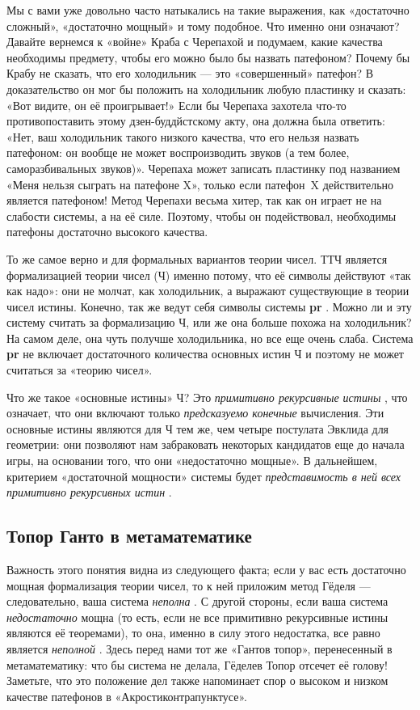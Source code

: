 \documentclass[../main.tex]{subfiles}
\begin{document}
Мы с вами уже довольно часто натыкались на такие выражения, как «достаточно сложный», «достаточно мощный» и тому подобное. Что именно они означают? Давайте вернемся к «войне» Краба с Черепахой и подумаем, какие качества необходимы предмету, чтобы его можно было бы назвать патефоном? Почему бы Крабу не сказать, что его холодильник --- это «совершенный» патефон? В доказательство он мог бы положить на холодильник любую пластинку и сказать: «Вот видите, он её проигрывает!» Если бы Черепаха захотела что-то противопоставить этому дзен-буддйстскому акту, она должна была ответить: «Нет, ваш холодильник такого низкого качества, что его нельзя назвать патефоном: он вообще не может воспроизводить звуков (а тем более, саморазбивальных звуков)». Черепаха может записать пластинку под названием «Меня нельзя сыграть на патефоне X», только если патефон~X действительно является патефоном! Метод Черепахи весьма хитер, так как он играет не на слабости системы, а на её силе. Поэтому, чтобы он подействовал, необходимы патефоны достаточно высокого качества.

То же самое верно и для формальных вариантов теории чисел. ТТЧ является формализацией теории чисел (Ч) именно потому, что её символы действуют «так как надо»: они не молчат, как холодильник, а выражают существующие в теории чисел истины. Конечно, так же ведут себя символы системы \textbf{pr} . Можно ли и эту систему считать за формализацию Ч, или же она больше похожа на холодильник? На самом деле, она чуть получше холодильника, но все еще очень слаба. Система \textbf{pr} не включает достаточного количества основных истин Ч и поэтому не может считаться за «теорию чисел».

Что же такое «основные истины» Ч? Это \emph{примитивно рекурсивные истины} , что означает, что они включают только \emph{предсказуемо конечные} вычисления. Эти основные истины являются для Ч тем же, чем четыре постулата Эвклида для геометрии: они позволяют нам забраковать некоторых кандидатов еще до начала игры, на основании того, что они «недостаточно мощные». В дальнейшем, критерием «достаточной мощности» системы будет \emph{представимость в ней всех примитивно рекурсивных истин} .


\subsection{Топор Ганто в метаматематике}

Важность этого понятия видна из следующего факта; если у вас есть достаточно мощная формализация теории чисел, то к ней приложим метод Гёделя --- следовательно, ваша система \emph{неполна} . С другой стороны, если ваша система \emph{недостаточно} мощна (то есть, если не все примитивно рекурсивные истины являются её теоремами), то она, именно в силу этого недостатка, все равно является \emph{неполной} . Здесь перед нами тот же «Гантов топор», перенесенный в метаматематику: что бы система не делала, Гёделев Топор отсечет её голову! Заметьте, что это положение дел также напоминает спор о высоком и низком качестве патефонов в «Акростиконтрапунктусе».
\end{document}
